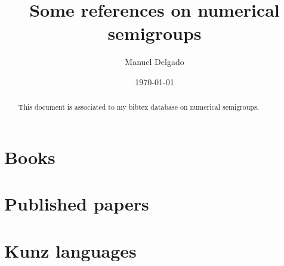 \documentclass[11pt]{amsart}
\title{Some references on numerical semigroups}
\author{Manuel Delgado
\email{mdelgado@fc.up.pt}
}
\date{\today}
\begin{document}

\begin{abstract}
This document is associated to my bibtex database on numerical semigroups. 
\end{abstract}
\maketitle

\section{Books}\label{sec:books}

\section{Published papers}\label{sec:publshed-papers}

\section{Kunz languages}\label{sec:preprints}
 
\printbibliography
%
%
%
\end{document}
